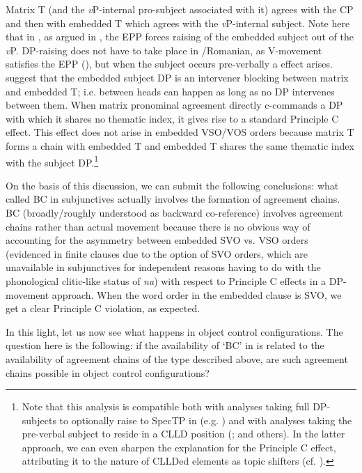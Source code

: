 \documentclass[output=paper]{langsci/langscibook}
\begin{document}
Matrix T (and the \textit{v}P-internal pro-subject associated with it) agrees with the CP and then with embedded T which agrees with the \textit{v}P-internal subject. Note here that in , as argued in \citet{Halpert2016}, the EPP forces raising of the embedded subject out of the \textit{v}P. DP-raising does not have to take place in \slash Romanian, as V-movement satisfies the EPP (\citeauthor{Alexiadou1998}\linebreak\citeyear{Alexiadou1998}), but when the subject occurs pre-verbally a  effect arises. \citet{Tsakali2017} suggest that the embedded subject DP is an intervener blocking  between matrix and embedded T; i.e.  between heads can happen as long as no DP intervenes between them. When matrix pronominal agreement directly c-commands a DP with which it shares no thematic index, it gives rise to a standard Principle C effect. This effect does not arise in embedded VSO\slash VOS orders because matrix T forms a chain with embedded T and embedded T shares the same thematic index with the subject DP.\footnote{Note that this analysis is compatible both with analyses taking full DP-subjects to optionally raise to SpecTP in  (e.g. \citealt{Spyropoulos2009}) and with analyses taking the pre-verbal subject to reside in a CLLD position (\citealt{Alexiadou1998}; \citealt{Barbosa2009} and others). In the latter approach, we can even sharpen the explanation for the Principle C effect, attributing it to the nature of CLLDed elements as topic shifters (cf. \citealt{Frascarelli2007}).}   

On the basis of this discussion, we can submit the following conclusions: what \citet{Alexiadou2010} called BC in subjunctives actually involves the formation of agreement chains. BC (broadly\slash roughly understood as backward co-reference) involves agreement chains rather than actual movement because there is no obvious way of accounting for the asymmetry between embedded SVO vs. VSO orders (evidenced in finite clauses due to the option of SVO orders, which are unavailable in subjunctives for independent reasons having to do with the phonological clitic-like status of \textit{na}) with respect to Principle C effects in a DP-move\-ment approach. When the word order in the embedded clause is SVO, we get a clear Principle C violation, as expected.

In this light, let us now see what happens in object control configurations. The question here is the following: if the availability of ‘BC’ in  is related to the availability of agreement chains of the type described above, are such agreement chains possible in object control configurations?
\end{document}
